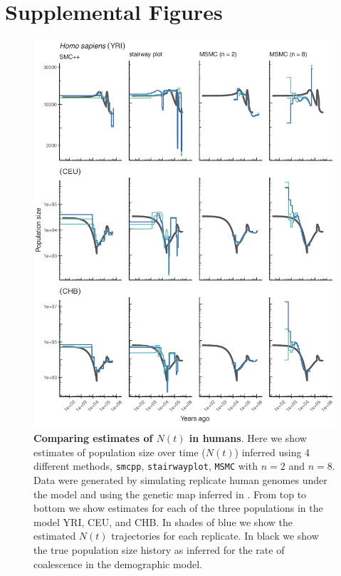 \documentclass[12pt,halfline,a4paper]{ouparticle}
\newcommand{\MSMC}{\texttt{MSMC}\xspace}
\newcommand{\smcpp}{\texttt{smcpp}\xspace}
\newcommand{\stairwayplot}{\texttt{stairwayplot}\xspace}
\begin{document}
\section*{Supplemental Figures}
\begin{figure}
\begin{center}
\includegraphics[width=0.8\linewidth]{display_items/homo_sapiens_mask_Gutenkunst.png}
\caption{\textbf{Comparing estimates of $N(t)$ in humans}. Here we show estimates of population
size over time ($N(t)$) inferred using 4 different methods, \smcpp, \stairwayplot,
\MSMC with $n=2$ and $n=8$. Data were generated by simulating
replicate human genomes under the \cite{gutenkunst2009inferring} model and using the genetic map
inferred in \cite{international2007second}. From top to bottom we show estimates for each
of the three populations in the model YRI, CEU, and CHB. In shades of blue we show the estimated
$N(t)$ trajectories for each replicate. In black we show the true population size history as inferred
for the rate of coalescence in the demographic model.}
\label{fig:n_t_gutenkunst}
\end{center}
\end{figure}
\end{document}
